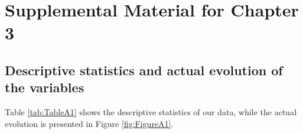 \documentclass[a4paper, twoside]{templates/ociamthesis}
\begin{document}
\hypertarget{appendixc}{%
\chapter{Supplemental Material for Chapter 3}\label{appendixc}}

\hypertarget{appendixc1}{%
\section{Descriptive statistics and actual evolution of the variables}\label{appendixc1}}

Table \ref{tab:TableA1} shows the descriptive statistics of our data, while the actual evolution is presented in Figure \ref{fig:FigureA1}.

\begin{table}[H]


\end{table}
\end{document}
